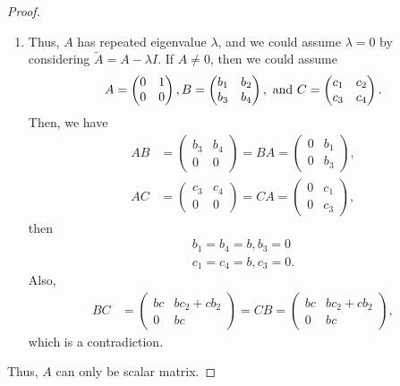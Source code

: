 \documentclass[11pt]{book}
\theoremstyle{definition}
\numberwithin{equation}{chapter}
\begin{document}
\begin{proof}
\begin{enumerate}[label=(\alph*)]
    \item Thus, $A$ has repeated eigenvalue $\lambda$, and we could assume $\lambda = 0$ by considering $\widetilde{A} = A - \lambda I$. If $A \neq 0$, then we could assume 
    \begin{align*}
        A = \begin{pmatrix}
            0 & 1 \\
            0 & 0
        \end{pmatrix}, B = \begin{pmatrix}
            b_1 & b_2 \\
            b_3 & b_4
        \end{pmatrix},\,\, {\rm and}\,\, C = \begin{pmatrix}
            c_1 & c_2 \\
            c_3 & c_4
        \end{pmatrix}.
    \end{align*}
    Then, we have
    \begin{align*}
        AB & = \begin{pmatrix}
            b_3 & b_4 \\
            0     & 0
        \end{pmatrix} = BA = \begin{pmatrix}
            0 & b_1 \\
            0 & b_3
        \end{pmatrix}, \\
        AC & = \begin{pmatrix}
            c_3 & c_4 \\
            0     & 0
        \end{pmatrix} = CA = \begin{pmatrix}
            0 & c_1 \\
            0 & c_3
        \end{pmatrix},
    \end{align*}
    then 
    \begin{align*}
        b_1 = b_4 = b, b_3 = 0 \\
        c_1 = c_4 = b, c_3 = 0.
    \end{align*}
    Also, 
    \begin{align*}
        BC & = \begin{pmatrix}
            bc & bc_2+cb_2 \\
            0     & bc
        \end{pmatrix} = CB = \begin{pmatrix}
            bc & bc_2+cb_2 \\
            0     & bc
        \end{pmatrix},
    \end{align*}
    which is a contradiction.
\end{enumerate}
Thus, $A$ can only be scalar matrix.
\end{proof}
\end{document}
